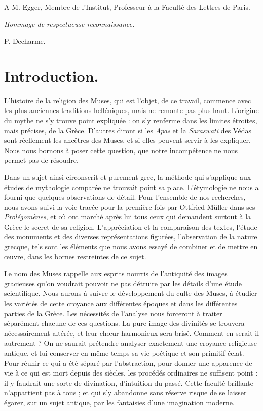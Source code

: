 \documentclass[a4paper, 11pt, oneside, polutonikogreek, french]{article}
\begin{document}
\setlength{\parskip}{1mm plus1mm minus1mm}
\clearpage
\Large
\tableofcontents
\clearpage
\vspace*{\fill}
A M. Egger, Membre de l'Institut, Professeur à la Faculté des Lettres de Paris.

\emph{Hommage de respectueuse reconnaissance.}

\bigskip

P. Decharme.
\vspace*{\fill}
\clearpage
\section*{Introduction.}
\paragraph{}
L'histoire de la religion des Muses, qui est l'objet, de ce travail, commence avec les plus anciennes traditions helléniques, mais ne remonte pas plus haut. L'origine du mythe ne s'y trouve point expliquée : on s'y renferme dans les limites étroites, mais précises, de la Grèce. D'autres diront si les \emph{Apas} et la \emph{Saraswati} des Védas sont réellement les ancêtres des Muses, et si elles peuvent servir à les expliquer. Nous nous bornons à poser cette question, que notre incompétence ne nous permet pas de résoudre.

Dans un sujet ainsi circonscrit et purement grec, la méthode qui s'applique aux études de mythologie comparée ne trouvait point sa place. L'étymologie ne nous a fourni que quelques observations de détail. Pour l'ensemble de nos recherches, nous avons suivi la voie tracée pour la première fois par Ottfried Müller dans ses \emph{Prolégomènes}, et où ont marché après lui tous ceux qui demandent surtout à la Grèce le secret de sa religion. L'appréciation et la comparaison des textes, l'étude des monuments et des diverses représentations figurées, l'observation de la nature grecque, tels sont les éléments que nous avons essayé de combiner et de mettre en œuvre, dans les bornes restreintes de ce sujet.

Le nom des Muses rappelle aux esprits nourris de l'antiquité des images gracieuses qu'on voudrait pouvoir ne pas détruire par les détails d'une étude scientifique. Nous aurons à suivre le développement du culte des Muses, à étudier les variétés de cette croyance aux différentes époques et dans les différentes parties de la Grèce. Les nécessités de l'analyse nous forceront à traiter séparément chacune de ces questions. La pure image des divinités se trouvera nécessairement altérée, et leur chœur harmonieux sera brisé. Comment en serait-il autrement ? On ne saurait prétendre analyser exactement une croyance religieuse antique, et lui conserver en même temps sa vie poétique et son primitif éclat. Pour réunir ce qui a été séparé par l'abstraction, pour donner une apparence de vie à ce qui est mort depuis des siècles, les procédés ordinaires ne suffisent point : il y faudrait une sorte de divination, d'intuition du passé. Cette faculté brillante n'appartient pas à tous ; et qui s'y abandonne sans réserve risque de se laisser égarer, sur un sujet antique, par les fantaisies d'une imagination moderne.
\end{document}
